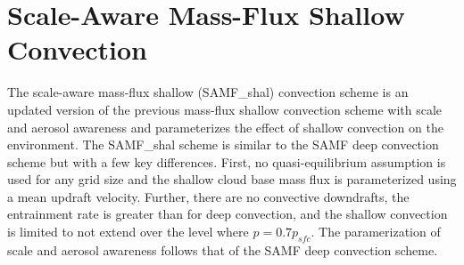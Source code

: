 \hypertarget{group___s_a_m_f__shal}{}\section{Scale-\/\+Aware Mass-\/\+Flux Shallow Convection}
\label{group___s_a_m_f__shal}


The scale-\/aware mass-\/flux shallow (S\+A\+M\+F\+\_\+shal) convection scheme is an updated version of the previous mass-\/flux shallow convection scheme with scale and aerosol awareness and parameterizes the effect of shallow convection on the environment. The S\+A\+M\+F\+\_\+shal scheme is similar to the S\+A\+MF deep convection scheme but with a few key differences. First, no quasi-\/equilibrium assumption is used for any grid size and the shallow cloud base mass flux is parameterized using a mean updraft velocity. Further, there are no convective downdrafts, the entrainment rate is greater than for deep convection, and the shallow convection is limited to not extend over the level where $p=0.7p_{sfc}$. The paramerization of scale and aerosol awareness follows that of the S\+A\+MF deep convection scheme.  




